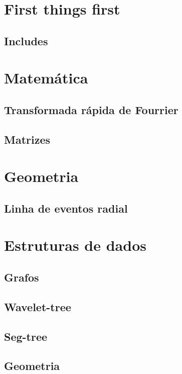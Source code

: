 \section{First things first}
\subsection{Includes}
\raggedbottom
\hrulefill
\clearpage
\section{Matemática}
\subsection{Transformada rápida de Fourrier}
\raggedbottom
\hrulefill
\subsection{Matrizes}
\raggedbottom
\hrulefill
\clearpage
\section{Geometria}
\subsection{Linha de eventos radial}
\raggedbottom
\hrulefill
\clearpage
\section{Estruturas de dados}
\subsection{Grafos}
\raggedbottom
\hrulefill
\subsection{Wavelet-tree}
\raggedbottom
\hrulefill
\subsection{Seg-tree}
\raggedbottom
\hrulefill
\subsection{Geometria}
\raggedbottom
\hrulefill
\clearpage
